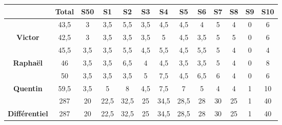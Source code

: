 \def\colorrow{\rowcolor[gray]{0.8}}
\begin{longtable}{|c|c|c|c|c|c|c|c|c|c|c|c|c|}
\hline
&{\bf Total}&{\bf S50}&{\bf S1}&{\bf S2}&{\bf S3}&{\bf S4}&{\bf S5}&{\bf S6}&{\bf S7}&{\bf S8}&{\bf S9}&{\bf S10}\\
\hline
\endhead
\colorrow {\bf Karen}&43,5&3&3,5&5,5&3,5&4,5&4,5&4&5&4&0&6\\
\hline
{\bf Victor}&42,5&3&3,5&3,5&3,5&5&4,5&3,5&5&5&0&6\\
\hline
\colorrow {\bf Clément}&45,5&3,5&3,5&5,5&4,5&5,5&4,5&5,5&5&4&0&4\\
\hline
{\bf Raphaël}&46&3,5&3,5&6,5&4&4,5&3,5&3,5&5&4&0&8\\
\hline
\colorrow {\bf Hugo}&50&3,5&3,5&3,5&5&7,5&4,5&6,5&6&4&0&6\\
\hline
{\bf Quentin}&59,5&3,5&5&8&4,5&7,5&7&5&4&4&1&10\\
\hline
\hline
\colorrow {\bf Total}&287&20&22,5&32,5&25&34,5&28,5&28&30&25&1&40\\
\hline
{\bf Différentiel}&287&20&22,5&32,5&25&34,5&28,5&28&30&25&1&40\\
\hline
\end{longtable}
